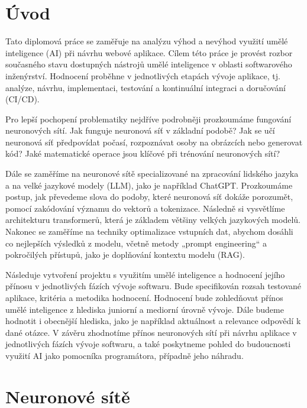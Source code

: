 \documentclass[FM,DP]{tulthesis}
\begin{document}
		\clearpage
		\listoffigures
		\clearpage 
		
		\chapter{Úvod}
		Tato diplomová práce se zaměřuje na analýzu výhod a nevýhod využití umělé inteligence (AI) při návrhu webové aplikace. Cílem této práce je provést rozbor současného stavu dostupných nástrojů umělé inteligence v oblasti softwarového inženýrství. Hodnocení proběhne v jednotlivých etapách vývoje aplikace, tj. analýze, návrhu, implementaci, testování a kontinuální integraci a doručování (CI/CD).
		
		Pro lepší pochopení problematiky nejdříve podrobněji prozkoumáme fungování neuronových sítí. Jak funguje neuronová síť v základní podobě? Jak se učí neuronová síť předpovídat počasí, rozpoznávat osoby na obrázcích nebo generovat kód? Jaké matematické operace jsou klíčové při trénování neuronových sítí?
		
		Dále se zaměříme na neuronové sítě specializované na zpracování lidského jazyka a na velké jazykové modely (LLM), jako je například ChatGPT. Prozkoumáme postup, jak převedeme slova do podoby, které neuronová síť dokáže porozumět, pomocí zakódování významu do vektorů a tokenizace. Následně si vysvětlíme architekturu transformerů, která je základem většiny velkých jazykových modelů. Nakonec se zaměříme na techniky optimalizace vstupních dat, abychom dosáhli co nejlepších výsledků z modelu, včetně metody „prompt engineering“ a pokročilých přístupů, jako je doplňování kontextu modelu (RAG).
		
		Následuje vytvoření projektu s využitím umělé inteligence a hodnocení jejího přínosu v jednotlivých fázích vývoje softwaru. Bude specifikován rozsah testované aplikace, kritéria a metodika hodnocení. Hodnocení bude zohledňovat přínos umělé inteligence z hlediska juniorní a mediorní úrovně vývoje. Dále budeme hodnotit i obecnější hlediska, jako je například aktuálnost a relevance odpovědí k dané otázce. V závěru zhodnotíme přínos neuronových sítí při návrhu aplikace v jednotlivých fázích vývoje softwaru, a také poskytneme pohled do budoucnosti využití AI jako pomocníka programátora, případně jeho náhradu.
		
		\chapter{Neuronové sítě} \label{nns}
\end{document}
